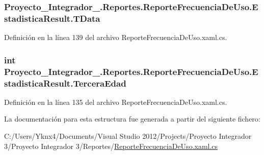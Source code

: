 \hypertarget{struct_proyecto___integrador__3_1_1_reportes_1_1_reporte_frecuencia_de_uso_1_1_estadistica_result_ad182093453a1c4839364affc65f7dbc7}{
\subsubsection[{T\-Data}]{ Proyecto\-\_\-\-Integrador\-\_.\-Reportes.\-Reporte\-Frecuencia\-De\-Uso.\-Estadistica\-Result.\-T\-Data}}\label{struct_proyecto___integrador__3_1_1_reportes_1_1_reporte_frecuencia_de_uso_1_1_estadistica_result_ad182093453a1c4839364affc65f7dbc7}


Definición en la línea 139 del archivo Reporte\-Frecuencia\-De\-Uso.\-xaml.\-cs.

\hypertarget{struct_proyecto___integrador__3_1_1_reportes_1_1_reporte_frecuencia_de_uso_1_1_estadistica_result_a1f03891dfd3acad9574d7336569a1163}{
\subsubsection[{Tercera\-Edad}]{\setlength{\rightskip}{0pt plus 5cm}int Proyecto\-\_\-\-Integrador\-\_.\-Reportes.\-Reporte\-Frecuencia\-De\-Uso.\-Estadistica\-Result.\-Tercera\-Edad}}\label{struct_proyecto___integrador__3_1_1_reportes_1_1_reporte_frecuencia_de_uso_1_1_estadistica_result_a1f03891dfd3acad9574d7336569a1163}


Definición en la línea 135 del archivo Reporte\-Frecuencia\-De\-Uso.\-xaml.\-cs.



La documentación para esta estructura fue generada a partir del siguiente fichero\-:\begin{DoxyCompactItemize}
\item 
C\-:/\-Users/\-Yknx4/\-Documents/\-Visual Studio 2012/\-Projects/\-Proyecto Integrador 3/\-Proyecto Integrador 3/\-Reportes/\hyperlink{_reporte_frecuencia_de_uso_8xaml_8cs}{Reporte\-Frecuencia\-De\-Uso.\-xaml.\-cs}\end{DoxyCompactItemize}
